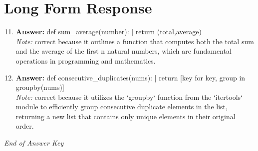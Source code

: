 \documentclass[12pt]{article}
\begin{document}
\section*{Long Form Response}
\begin{enumerate}[label=\arabic*.]
\setcounter{enumi}{10}
\item \textbf{Answer:} def sum\_average(number): | return (total,average)
\\ \textit{Note:} correct because it outlines a function that computes both the total sum and the average of the first n natural numbers, which are fundamental operations in programming and mathematics.
\item \textbf{Answer:} def consecutive\_duplicates(nums): | return [key for key, group in groupby(nums)]
\\ \textit{Note:} correct because it utilizes the `groupby` function from the `itertools` module to efficiently group consecutive duplicate elements in the list, returning a new list that contains only unique elements in their original order.
\end{enumerate}

\vfill
\noindent\textit{End of Answer Key}
\end{document}
